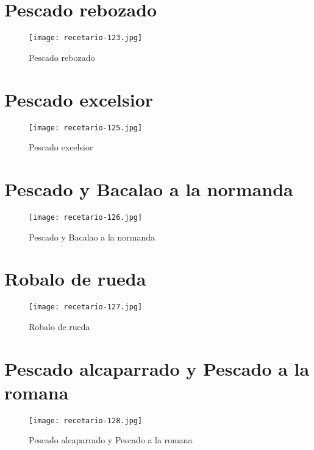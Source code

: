 \documentclass[12pt,letterpaper]{article}
\begin{document}
\newpage

\section{Pescado rebozado}
  \begin{figure}[H]
    \vspace{2pt}
  \texttt{[image: recetario-123.jpg]}
    \caption{Pescado rebozado}
    
  \end{figure}

\newpage

\section{Pescado excelsior}
  \begin{figure}[H]
    \vspace{2pt}
  \texttt{[image: recetario-125.jpg]}
    \caption{Pescado excelsior}
    
  \end{figure}

\newpage

\section{Pescado y Bacalao a la normanda}
  \begin{figure}[H]
    \vspace{2pt}
  \texttt{[image: recetario-126.jpg]}
    \caption{Pescado y Bacalao a la normanda}
    
  \end{figure}

\newpage

\section{Robalo de rueda}
  \begin{figure}[H]
    \vspace{2pt}
  \texttt{[image: recetario-127.jpg]}
    \caption{Robalo de rueda}
    
  \end{figure}

\newpage

\section{Pescado alcaparrado y Pescado a la romana}
  \begin{figure}[H]
    \vspace{2pt}
  \texttt{[image: recetario-128.jpg]}
    \caption{Pescado alcaparrado y Pescado a la romana}
    
  \end{figure}
\end{document}
